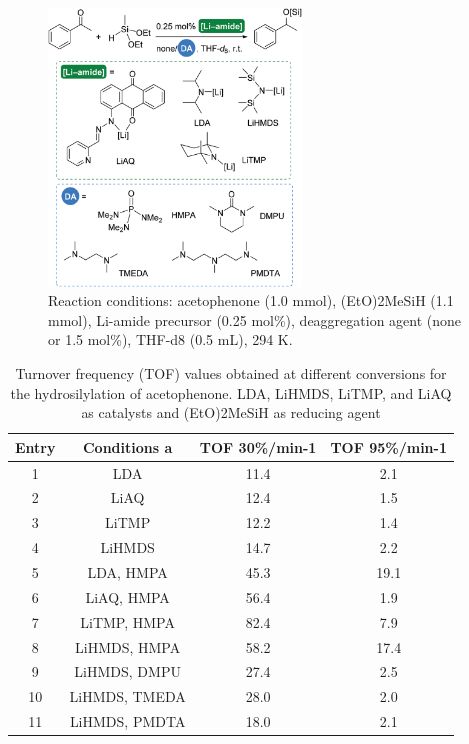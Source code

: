 \documentclass[journal=jacsat,manuscript=article]{achemso}
\begin{document}
	\begin{figure}[H]
	\includegraphics[width=0.6\textwidth]{figures/Reaction.PNG}		
	\centering
	\caption{Reaction conditions: acetophenone (1.0 mmol), (EtO)2MeSiH (1.1 mmol), Li-amide precursor (0.25 mol\%), deaggregation
		agent (none or 1.5 mol\%), THF-d8 (0.5 mL), 294 K.}
	\label{Scheme5}
	\end{figure}
	
	\begin{table}
		\caption{Turnover frequency (TOF) values obtained at different conversions for the hydrosilylation of acetophenone. LDA, LiHMDS, LiTMP, and LiAQ as catalysts and (EtO)2MeSiH as reducing agent}
		\begin{tabular}{|c|c|c|c}
			\hline
			Entry & Conditions a & TOF 30\%/min-1 & TOF 95\%/min-1 \\
			\hline
			1 & LDA & 11.4 & 2.1 \\
			\hline
			2 & LiAQ & 12.4 & 1.5 \\
			\hline
			3 & LiTMP & 12.2 & 1.4 \\
			\hline
			4 & LiHMDS & 14.7 & 2.2 \\
			\hline
			5 & LDA, HMPA & 45.3 & 19.1 \\
			\hline
			6 & LiAQ, HMPA & 56.4 & 1.9 \\
			\hline
			7 & LiTMP, HMPA & 82.4 & 7.9 \\
			\hline
			8 & LiHMDS, HMPA & 58.2 & 17.4 \\
			\hline
			9 & LiHMDS, DMPU & 27.4 & 2.5 \\
			\hline
			10 & LiHMDS, TMEDA & 28.0 & 2.0 \\
			\hline
			11 & LiHMDS, PMDTA & 18.0 & 2.1 \\
			\hline
		\end{tabular}
	\end{table}
		
\end{document}
